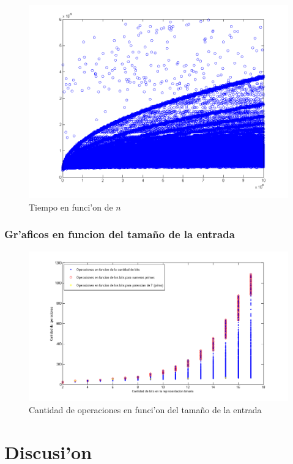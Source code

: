 \begin{figure}[H]
\centering
\includegraphics[scale=0.5]{../../codigo/ejercicio1/benchmark_de_tiempo/graficos/todos_los_numeros/todosLosNumerosPuntosTiempo.png}
\caption{Tiempo en funci'on de $n$}
\end{figure}
%
%
\subsubsection{Gr'aficos en funcion del tama\~{n}o de la entrada}
\begin{figure}[H]
\centering
\includegraphics[scale=0.7]{../../codigo/ejercicio1/benchmark/graficos/tamanio_Entrada_T/operacionesEntrada.png}
\caption{Cantidad de operaciones en funci'on del tama\~{n}o de la entrada}
\end{figure}

\section{Discusi'on}

